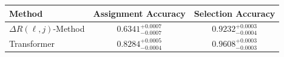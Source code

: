     \begin{tabular}{lcc}
        \toprule
        Method & Assignment Accuracy & Selection Accuracy \\
        \midrule
        $\Delta R(\ell,j)$-Method & $0.6341_{-0.0007}^{+0.0007}$ & $0.9232_{-0.0004}^{+0.0003}$ \\
        Transformer & $0.8284_{-0.0004}^{+0.0005}$ & $0.9608_{-0.0003}^{+0.0003}$ \\
        \bottomrule
    \end{tabular}